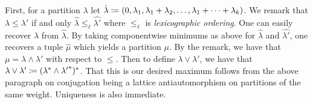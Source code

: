 \documentclass[letterpaper, 11pt, oneside]{book}
\begin{document}
\begin{sol}
  First, for a partition $\lambda$ let $\hat{\lambda} \coloneqq (0, \lambda_{1}, \lambda_{1} + \lambda_{2}, \ldots, \lambda_{1} + \cdots + \lambda_{k})$.
  We remark that $\lambda \leq \lambda'$ if and only $\hat{\lambda} \leq_{\ell} \hat{\lambda'}$ where $\leq_{\ell}$ is \emph{lexicographic ordering}.
  One can easily recover $\lambda$ from $\hat{\lambda}$.
  By taking componentwise minimums as above for $\hat{\lambda}$ and $\hat{\lambda'}$, one recovers a tuple $\hat{\mu}$ which yields a partition $\mu$.
  By the remark, we have that $\mu = \lambda \land \lambda'$ with respect to $\leq$.
  Then to define $\lambda \lor \lambda'$, we have that $\lambda \lor \lambda' \coloneqq (\lambda^{*} \land {\lambda'}^{*})^{*}$.
  That this is our desired maximum follows from the above paragraph on conjugation being a lattice antiautomorphism on partitions of the same weight.
  Uniqueness is also immediate.
\end{sol}

\clearpage
\end{document}
